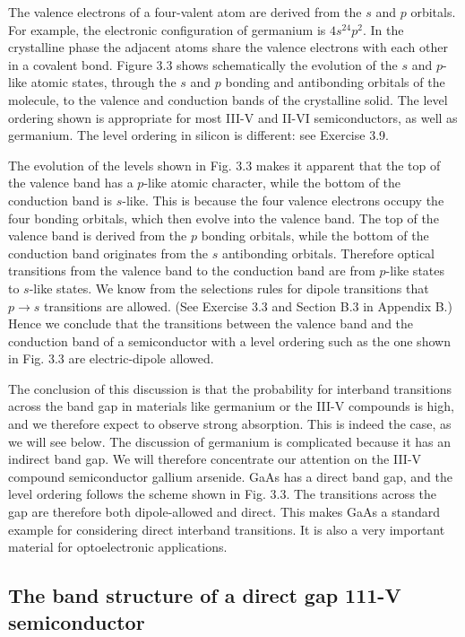 \documentclass[12pt]{book}
\begin{document}
The valence electrons of a four-valent atom are derived from the $s$ and $p$ orbitals. For example, the electronic configuration of germanium is $4s^24p^2$. In the crystalline phase the adjacent atoms share the valence electrons with each other in a covalent bond. Figure 3.3 shows schematically the evolution of the $s$ and $p$-like atomic states, through the $s$ and $p$ bonding and antibonding orbitals of the molecule, to the valence and conduction bands of the crystalline solid. The level ordering shown is appropriate for most III-V and II-VI semiconductors, as well as germanium. The level ordering in silicon is different: see Exercise 3.9.

The evolution of the levels shown in Fig. 3.3 makes it apparent that the top of the valence band has a $p$-like atomic character, while the bottom of the conduction band is $s$-like. This is because the four valence electrons occupy the four bonding orbitals, which then evolve into the valence band. The top of the valence band is derived from the $p$ bonding orbitals, while the bottom of the conduction band originates from the $s$ antibonding orbitals. Therefore optical transitions from the valence band to the conduction band are from $p$-like states to $s$-like states. We know from the selections rules for dipole transitions that $p \rightarrow s$ transitions are allowed. (See Exercise 3.3 and Section B.3 in Appendix B.) Hence we conclude that the transitions between the valence band and the conduction band of a semiconductor with a level ordering such as the one shown in Fig. 3.3 are electric-dipole allowed.

The conclusion of this discussion is that the probability for interband transitions across the band gap in materials like germanium or the III-V compounds is high, and we therefore expect to observe strong absorption. This is indeed the case, as we will see below. The discussion of germanium is complicated because it has an indirect band gap. We will therefore concentrate our attention on the III-V compound semiconductor gallium arsenide. GaAs has a direct band gap, and the level ordering follows the scheme shown in Fig. 3.3. The transitions across the gap are therefore both dipole-allowed and direct. This makes GaAs a standard example for considering direct interband transitions. It is also a very important material for optoelectronic applications.

\subsection{The band structure of a direct gap 111-V semiconductor}
\end{document}
